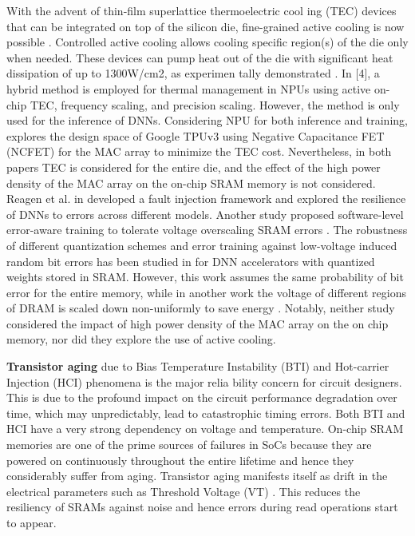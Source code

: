 \documentclass[sigconf]{acmart}
\begin{document}
 With the advent of thin-film superlattice thermoelectric cool ing (TEC) devices that can be integrated on top of the silicon die, fine-grained active cooling is now possible \cite{ref5}. Controlled active cooling allows cooling specific region(s) of the die only when needed. These devices can pump heat out of the die with significant heat dissipation of up to 1300W/cm2, as experimen tally demonstrated \cite{ref6}. In [4], a hybrid method is employed for thermal management in NPUs using active on-chip TEC, frequency scaling, and precision scaling. However, the method is only used for the inference of DNNs. Considering NPU for both inference and training, \cite{ref7} explores the design space of Google TPUv3 using Negative Capacitance FET (NCFET) for the MAC array to minimize the TEC cost. Nevertheless, in both papers TEC is considered for the entire die, and the effect of the high power density of the MAC array on the on-chip SRAM memory is not considered. Reagen et al. in \cite{ref8} developed a fault injection framework and explored the resilience of DNNs to errors across different models. Another study proposed software-level error-aware training to tolerate voltage overscaling SRAM errors \cite{ref9}. The robustness of different quantization schemes and error training against low-voltage induced random bit errors has been studied in \cite{ref10} for DNN accelerators with quantized weights stored in SRAM. However, this work assumes the same probability of bit error for the entire memory, while in another work the voltage of different regions of DRAM is scaled down non-uniformly to save energy \cite{ref11}. Notably, neither study considered the impact of high power density of the MAC array on the on chip memory, nor did they explore the use of active cooling.

\textbf{Transistor aging} due to Bias Temperature Instability (BTI) and Hot-carrier Injection (HCI) phenomena is the major relia bility concern for circuit designers. This is due to the profound impact on the circuit performance degradation over time, which may unpredictably, lead to catastrophic timing errors. Both BTI and HCI have a very strong dependency on voltage and temperature. On-chip SRAM memories are one of the prime sources of failures in SoCs because they are powered on continuously throughout the entire lifetime and hence they considerably suffer from aging. Transistor aging manifests itself as drift in the electrical parameters such as Threshold Voltage (VT) \cite{ref12}. This reduces the resiliency of SRAMs against noise and hence errors during read operations start to appear. 
\end{document}
